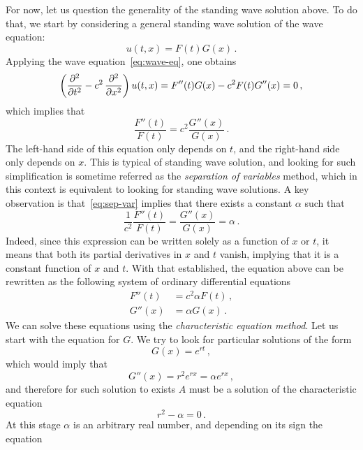 For now, let us question the generality of the standing wave solution above. To do that,
we start by considering a general standing wave solution of the wave equation:
\begin{equation}
  u(t,x)=F(t)G(x)\,.
\end{equation}
Applying the wave equation~\cref{eq:wave-eq}, one obtains
\begin{equation}
  \left(\frac{\partial^{2} }{\partial t^{2}}-c^2\,\frac{\partial^{2} }{\partial x^{2}}\right)u(t,x)=F''(t)G(x)-c^2F(t)G''(x)=0\,,
\end{equation}
which implies that
\begin{equation}
  \frac{F''(t)}{F(t)}=c^2\frac{G''(x)}{G(x)}\,.\label{eq:sep-var}
\end{equation}
The left-hand side of this equation only depends on $t$, and the right-hand side only
depends on $x$. This is typical of standing wave solution, and looking for such
simplification is sometime referred as the \emph{separation of variables} method, which in
this context is equivalent to looking for standing wave solutions. A key observation is
that~\cref{eq:sep-var} implies that there exists a constant $\alpha$ such that
\begin{equation}
  \frac{1}{c^2}\frac{F''(t)}{F(t)}=\frac{G''(x)}{G(x)}=\alpha\,.
\end{equation}
Indeed, since this expression can be written solely as a function of $x$ or $t$, it means
that both its partial derivatives in $x$ and $t$ vanish, implying that it is a constant
function of $x$ and $t$. With that established, the equation above can be rewritten as the
following system of ordinary differential equations
\begin{align}
  F''(t)&=c^2\alpha F(t)\,,\label{eq:sep-var-F}\\
  G''(x)&=\alpha G(x)\,.
\end{align}
We can solve these equations using the \emph{characteristic equation method}. Let us start
with the equation for $G$. We try to look for particular solutions of the form
\begin{equation}
  G(x)=e^{rt}\,,
\end{equation}
which would imply that
\begin{equation}
  G''(x)=r^2e^{rx}=\alpha e^{rx}\,,
\end{equation}
and therefore for such solution to exists $A$ must be a solution of the characteristic
equation
\begin{equation}
  r^2-\alpha=0\,.
\end{equation}
At this stage $\alpha$ is an arbitrary real number, and depending on its sign the equation
